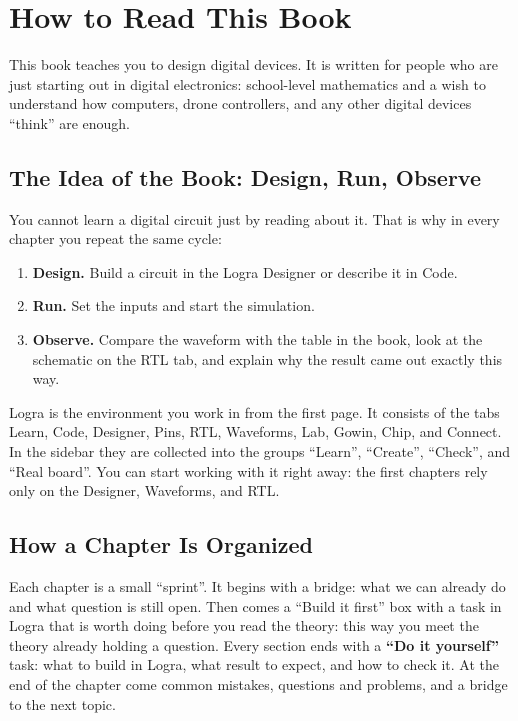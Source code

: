 \chapter*{How to Read This Book}

This book teaches you to design digital devices. It is written for people
who are just starting out in digital electronics: school-level mathematics
and a wish to understand how computers, drone controllers, and any other
digital devices ``think'' are enough.

\section*{The Idea of the Book: Design, Run, Observe}

You cannot learn a digital circuit just by reading about it. That is why in
every chapter you repeat the same cycle:

\begin{enumerate}
  \item \textbf{Design.} Build a circuit in the Logra Designer or describe it
    in Code.
  \item \textbf{Run.} Set the inputs and start the simulation.
  \item \textbf{Observe.} Compare the waveform with the table in the book,
    look at the schematic on the RTL tab, and explain why the result came out
    exactly this way.
\end{enumerate}

Logra is the environment you work in from the first page. It consists of the
tabs Learn, Code, Designer, Pins, RTL, Waveforms, Lab, Gowin, Chip, and
Connect. In the sidebar they are collected into the groups ``Learn'',
``Create'', ``Check'', and ``Real board''. You can start working with it right
away: the first chapters rely only on the Designer, Waveforms, and RTL.

\section*{How a Chapter Is Organized}

Each chapter is a small ``sprint''. It begins with a bridge: what we can
already do and what question is still open. Then comes a ``Build it first''
box with a task in Logra that is worth doing before you read the theory: this
way you meet the theory already holding a question. Every section ends with a
\textbf{``Do it yourself''} task: what to build in Logra, what result to
expect, and how to check it. At the end of the chapter come common mistakes,
questions and problems, and a bridge to the next topic.

